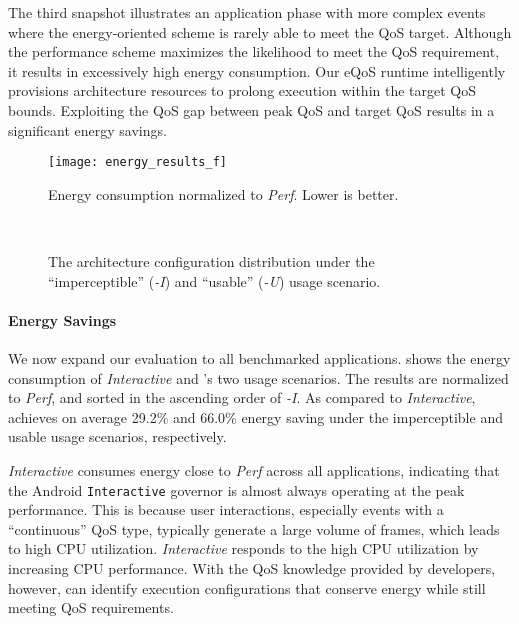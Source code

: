 The third snapshot illustrates an application phase with more complex events where the energy-oriented scheme is rarely able to meet the QoS target. Although the performance scheme maximizes the likelihood to meet the QoS requirement, it results in excessively high energy consumption. Our eQoS runtime intelligently provisions architecture resources to prolong execution within the target QoS bounds. Exploiting the QoS gap between peak QoS and target QoS results in a significant energy savings.

\begin{figure}[t]
\centering
\texttt{[image: energy\_results\_f]}
\caption{Energy consumption normalized to \textit{Perf}. Lower is better.}
\label{fig:energy_results_f}
\end{figure}

\begin{figure}[p]
\centering
{}\\
\vspace*{25pt}
\caption{The architecture configuration distribution under the ``imperceptible'' (\textit{\ebs-I}) and ``usable''  (\textit{\ebs-U}) usage scenario.}
\label{fig:freq_dist}
\end{figure}

\paragraph{Energy Savings} We now expand our evaluation to all benchmarked applications.  shows the energy consumption of \textit{Interactive} and \ebs's two usage scenarios. The results are normalized to \textit{Perf}, and sorted in the ascending order of \textit{\ebs-I}. As compared to \textit{Interactive}, \ebs achieves on average 29.2\% and 66.0\% energy saving under the imperceptible and usable usage scenarios, respectively.

\textit{Interactive} consumes energy close to \textit{Perf} across all applications, indicating that the Android \texttt{Interactive} governor is almost always operating at the peak performance. This is because user interactions, especially events with a ``continuous'' QoS type, typically generate a large volume of frames, which leads to high CPU utilization. \textit{Interactive} responds to the high CPU utilization by increasing CPU performance. With the QoS knowledge provided by developers, however, \ebs can identify execution configurations that conserve energy while still meeting QoS requirements.

